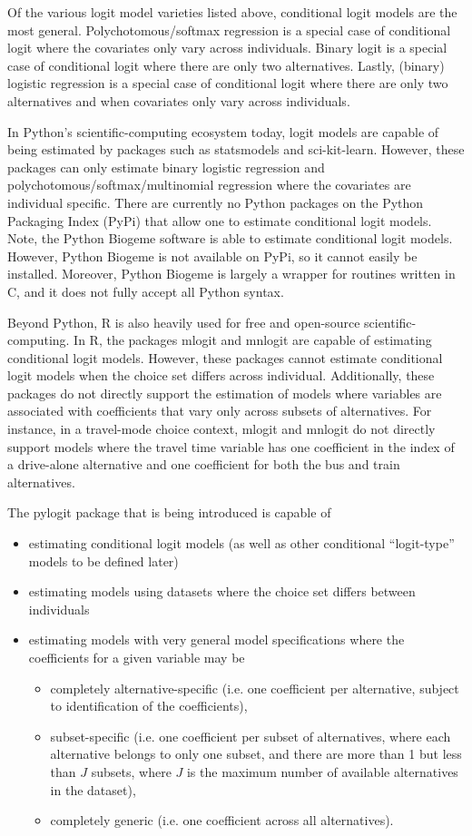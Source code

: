 \documentclass{article}
\begin{document}
Of the various logit model varieties listed above, conditional logit models are the most general. Polychotomous/softmax regression is a special case of conditional logit where the covariates only vary across individuals. Binary logit is a special case of conditional logit where there are only two alternatives. Lastly, (binary) logistic regression is a special case of conditional logit where there are only two alternatives and when covariates only vary across individuals.

In Python's scientific-computing ecosystem today, logit models are capable of being estimated by packages such as statsmodels and sci-kit-learn. However, these packages can only estimate binary logistic regression and polychotomous/softmax/multinomial regression where the covariates are individual specific. There are currently no Python packages on the Python Packaging Index (PyPi) that allow one to estimate conditional logit models. Note, the Python Biogeme software is able to estimate conditional logit models. However, Python Biogeme is not available on PyPi, so it cannot easily be installed. Moreover, Python Biogeme is largely a wrapper for routines written in C, and it does not fully accept all Python syntax.

Beyond Python, R is also heavily used for free and open-source scientific-computing. In R, the packages mlogit and mnlogit are capable of estimating conditional logit models. However, these packages cannot estimate conditional logit models when the choice set differs across individual. Additionally, these packages do not directly support the estimation of models where variables are associated with coefficients that vary only across subsets of alternatives. For instance, in a travel-mode choice context, mlogit and mnlogit do not directly support models where the travel time variable has one coefficient in the index of a drive-alone alternative and one coefficient for both the bus and train alternatives.

The pylogit package that is being introduced is capable of
\begin{itemize}
\item estimating conditional logit models (as well as other conditional ``logit-type'' models to be defined later)
\item estimating models using datasets where the choice set differs between individuals
\item estimating models with very general model specifications where the coefficients for a given variable may be  
\begin{itemize}
\item completely alternative-specific (i.e. one coefficient per alternative, subject to identification of the coefficients),
\item subset-specific (i.e. one coefficient per subset of alternatives, where each alternative belongs to only one subset, and there are more than 1 but less than $J$ subsets, where $J$ is the maximum number of available alternatives in the dataset),
\item completely generic (i.e. one coefficient across all alternatives).
\end{itemize}
\end{itemize}
\end{document}
